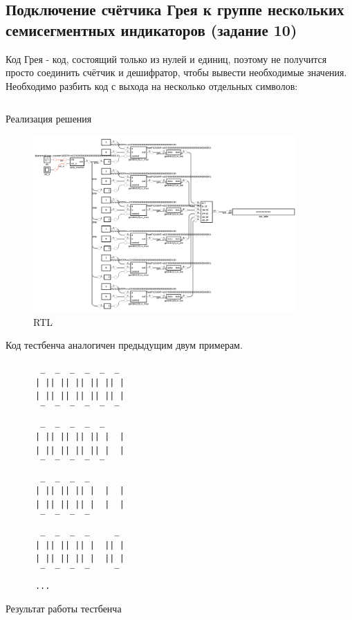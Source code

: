 \documentclass[a4paper]{article}
\begin{document}
  \subsection{Подключение счётчика Грея к группе нескольких семисегментных индикаторов (задание 10)}

  Код Грея - код, состоящий только из нулей и единиц, поэтому не получится просто соединить
  счётчик и дешифратор, чтобы вывести необходимые значения. Необходимо
  разбить код с выхода на несколько отдельных символов:

  \begin{listing}[H]
    \inputminted{verilog}{../chapter_6/extra/10/task10.v}
    \caption{Реализация решения}
  \end{listing}

  \begin{figure}[H]
    \centering
    \includegraphics[width=0.9\textwidth]{lab_327.png}
    \caption{RTL}
  \end{figure}

  Код тестбенча аналогичен предыдущим двум примерам.

  \begin{listing}[H]
    \begin{verbatim}
       _  _  _  _  _  _ 
      | || || || || || |
      | || || || || || |
       ‾  ‾  ‾  ‾  ‾  ‾ 
       _  _  _  _  _    
      | || || || || |  |
      | || || || || |  |
       ‾  ‾  ‾  ‾  ‾    
       _  _  _  _       
      | || || || |  |  |
      | || || || |  |  |
       ‾  ‾  ‾  ‾       
       _  _  _  _     _ 
      | || || || |  || |
      | || || || |  || |
       ‾  ‾  ‾  ‾     ‾ 
      ...
    \end{verbatim}
    \caption{Результат работы тестбенча}
  \end{listing}
\end{document}
